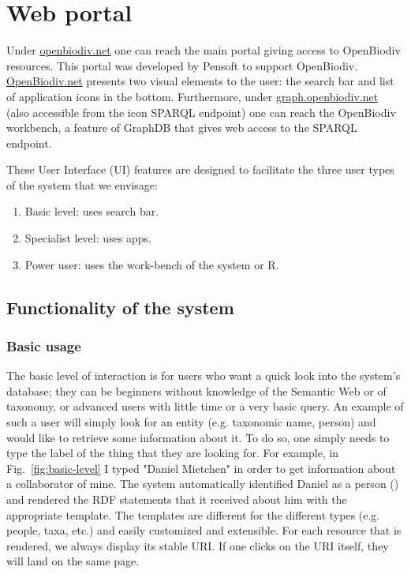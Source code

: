 
\chapter{Web portal} %
\label{chapter-webportal}


Under \href{http://openbiodiv.net}{\url{openbiodiv.net}} one can reach the main portal giving access to OpenBiodiv resources. This portal was developed by Pensoft to support OpenBiodiv. \href{http://openbiodiv.net}{OpenBiodiv.net} presents two visual elements to the user: the search bar and list of application icons in the bottom. Furthermore, under \href{http://graph.openbiodiv.net}{\url{graph.openbiodiv.net}} (also accessible from the icon SPARQL endpoint) one can reach the OpenBiodiv workbench, a feature of GraphDB that gives web access to the SPARQL endpoint.

These User Interface (UI) features are designed to facilitate the three user types of the system that we envisage:

\begin{enumerate}
    \item Basic level: uses search bar.
    \item Specialist level: uses apps.
    \item Power user: uses the work-bench of the system or R.
\end{enumerate}

\section{Functionality of the system}

\subsection{Basic usage}

The basic level of interaction is for users who want a quick look into the system's database; they can be beginners without knowledge of the Semantic Web or of taxonomy, or advanced users with little time or a very basic query. An example of such a user will simply look for an entity (e.g. taxonomic name, person) and would like to retrieve some information about it. To do so, one simply needs to type the label of the thing that they are looking for. For example, in Fig.~\ref{fig:basic-level} I typed "Daniel Mietchen" in order to get information about a collaborator of mine. The system automatically identified Daniel as a person () and rendered the RDF statements that it received about him with the appropriate template. The templates are different for the different types (e.g. people, taxa, etc.) and easily customized and extensible. For each resource that is rendered, we always display its stable URI. If one clicks on the URI itself, they will land on the same page.


